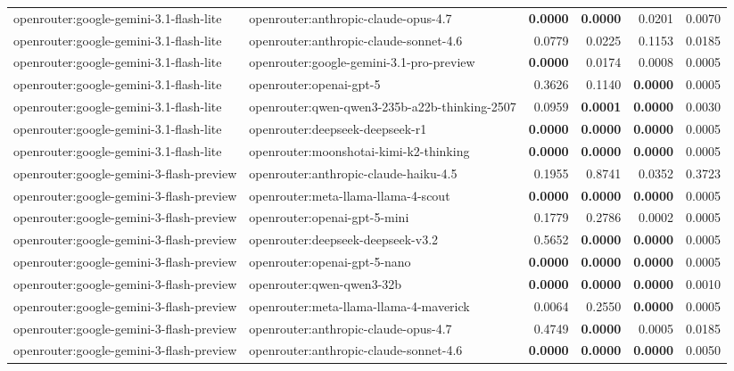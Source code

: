 \begin{table}[t]
\begin{tabular}{llrrrr}
openrouter:google-gemini-3.1-flash-lite & openrouter:anthropic-claude-opus-4.7 & \textbf{0.0000} & \textbf{0.0000} & 0.0201 & 0.0070 \\
openrouter:google-gemini-3.1-flash-lite & openrouter:anthropic-claude-sonnet-4.6 & 0.0779 & 0.0225 & 0.1153 & 0.0185 \\
openrouter:google-gemini-3.1-flash-lite & openrouter:google-gemini-3.1-pro-preview & \textbf{0.0000} & 0.0174 & 0.0008 & 0.0005 \\
openrouter:google-gemini-3.1-flash-lite & openrouter:openai-gpt-5 & 0.3626 & 0.1140 & \textbf{0.0000} & 0.0005 \\
openrouter:google-gemini-3.1-flash-lite & openrouter:qwen-qwen3-235b-a22b-thinking-2507 & 0.0959 & \textbf{0.0001} & \textbf{0.0000} & 0.0030 \\
openrouter:google-gemini-3.1-flash-lite & openrouter:deepseek-deepseek-r1 & \textbf{0.0000} & \textbf{0.0000} & \textbf{0.0000} & 0.0005 \\
openrouter:google-gemini-3.1-flash-lite & openrouter:moonshotai-kimi-k2-thinking & \textbf{0.0000} & \textbf{0.0000} & \textbf{0.0000} & 0.0005 \\
openrouter:google-gemini-3-flash-preview & openrouter:anthropic-claude-haiku-4.5 & 0.1955 & 0.8741 & 0.0352 & 0.3723 \\
openrouter:google-gemini-3-flash-preview & openrouter:meta-llama-llama-4-scout & \textbf{0.0000} & \textbf{0.0000} & \textbf{0.0000} & 0.0005 \\
openrouter:google-gemini-3-flash-preview & openrouter:openai-gpt-5-mini & 0.1779 & 0.2786 & 0.0002 & 0.0005 \\
openrouter:google-gemini-3-flash-preview & openrouter:deepseek-deepseek-v3.2 & 0.5652 & \textbf{0.0000} & \textbf{0.0000} & 0.0005 \\
openrouter:google-gemini-3-flash-preview & openrouter:openai-gpt-5-nano & \textbf{0.0000} & \textbf{0.0000} & \textbf{0.0000} & 0.0005 \\
openrouter:google-gemini-3-flash-preview & openrouter:qwen-qwen3-32b & \textbf{0.0000} & \textbf{0.0000} & \textbf{0.0000} & 0.0010 \\
openrouter:google-gemini-3-flash-preview & openrouter:meta-llama-llama-4-maverick & 0.0064 & 0.2550 & \textbf{0.0000} & 0.0005 \\
openrouter:google-gemini-3-flash-preview & openrouter:anthropic-claude-opus-4.7 & 0.4749 & \textbf{0.0000} & 0.0005 & 0.0185 \\
openrouter:google-gemini-3-flash-preview & openrouter:anthropic-claude-sonnet-4.6 & \textbf{0.0000} & \textbf{0.0000} & \textbf{0.0000} & 0.0050 \\

\end{tabular}
\end{table}
